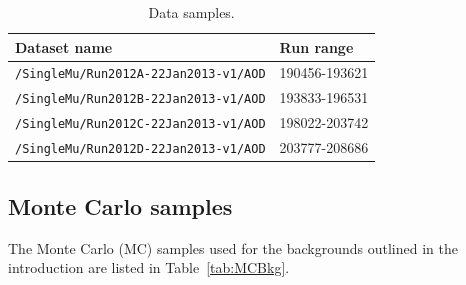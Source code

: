 \begin{table}
\begin{center}
\singlespacing
\begin{tabular}{ll}
	\hline
	Dataset name & Run range \\
	\hline
	\texttt{/SingleMu/Run2012A-22Jan2013-v1/AOD} & 190456-193621 \\
	\texttt{/SingleMu/Run2012B-22Jan2013-v1/AOD} & 193833-196531 \\
	\texttt{/SingleMu/Run2012C-22Jan2013-v1/AOD} & 198022-203742 \\
	\texttt{/SingleMu/Run2012D-22Jan2013-v1/AOD} & 203777-208686 \\
	\hline
\end{tabular}
\caption{Data samples.}
\label{tab:Data}
\end{center}
\end{table}

\subsection{Monte Carlo samples\label{sec:datasets-MC}}
The Monte Carlo (MC) samples used for the backgrounds outlined in the introduction are listed in Table~\ref{tab:MCBkg}.

